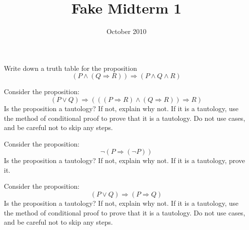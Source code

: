 \documentclass[12pt]{midterm}
\title{Fake Midterm 1}
\date{October 2010}
\begin{document}
\begin{exam}

\begin{problem}[360]
  Write down a truth table for the proposition
  $$
  \left( P \wedge (Q \Rightarrow R) \right) \Rightarrow \left(P \wedge Q \wedge R\right)
  $$
\end{problem}

\begin{solution}\begin{solutiontext}
\end{solutiontext}\end{solution}

\begin{problem}[360]
  Consider the proposition:
  $$
  \left( P \vee Q \right) \Rightarrow \left( \left( \left(P \Rightarrow R\right) \wedge \left(Q \Rightarrow R\right) \right) \Rightarrow R \right)
  $$
  Is the proposition a tautology?  If not, explain why not.  If it is
  a tautology, use the method of conditional proof to prove that it is
  a tautology.  Do not use cases, and be careful not to skip any
  steps.
\end{problem}

\begin{solution}\begin{solutiontext}
\end{solutiontext}\end{solution}

\begin{problem}[360]
  Consider the proposition:
  $$
  \neg \left( P \Rightarrow \left(\neg P\right) \right)
  $$
  Is the proposition a tautology?  If not, explain why not.  If it is
  a tautology, prove it.  
\end{problem}

\begin{solution}\begin{solutiontext}
\end{solutiontext}\end{solution}

\begin{problem}[360]
  Consider the proposition:
  $$
  (P \vee Q) \Rightarrow (P \Rightarrow Q)
  $$
  Is the proposition a tautology?  If not, explain why not.  If it is
  a tautology, use the method of conditional proof to prove that it is
  a tautology.  Do not use cases, and be careful not to skip any
  steps.
\end{problem}


\end{exam}
\end{document}
